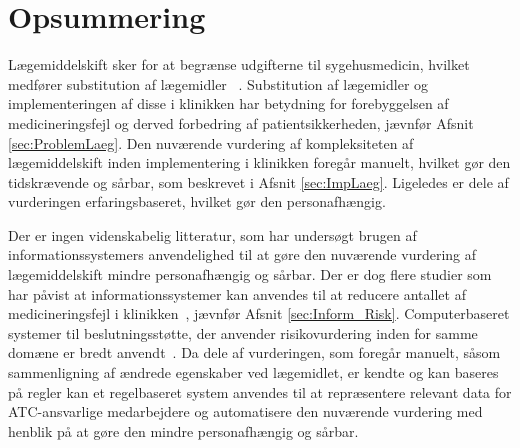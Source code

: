 
\section{Opsummering}
Lægemiddelskift sker for at begrænse udgifterne til sygehusmedicin, hvilket medfører substitution af lægemidler ~\citep{Ess2003, Johnston2011}. Substitution af lægemidler og implementeringen af disse i klinikken har betydning for forebyggelsen af medicineringsfejl og derved forbedring af patientsikkerheden, jævnfør Afsnit \ref{sec:ProblemLaeg}. Den nuværende vurdering af kompleksiteten af lægemiddelskift inden implementering i klinikken foregår manuelt, hvilket gør den tidskrævende og sårbar, som beskrevet i Afsnit \ref{sec:ImpLaeg}. Ligeledes er dele af vurderingen erfaringsbaseret, hvilket gør den personafhængig.

Der er ingen videnskabelig litteratur, som har undersøgt brugen af informationssystemers anvendelighed til at gøre den nuværende vurdering af lægemiddelskift mindre personafhængig og sårbar. Der er dog flere studier som har påvist at informationssystemer kan anvendes til at reducere antallet af medicineringsfejl i klinikken~\citep{Agrawal2009, Stenner2010, Fischer2008, Simpson2008}, jævnfør Afsnit \ref{sec:Inform_Risk}. Computerbaseret systemer til beslutningsstøtte, der anvender risikovurdering inden for samme domæne er bredt anvendt~\citep{Geissert2018, Rawshani2018}. Da dele af vurderingen, som foregår manuelt, såsom sammenligning af ændrede egenskaber ved lægemidlet, er kendte og kan baseres på regler kan et regelbaseret system anvendes til at repræsentere relevant data for ATC-ansvarlige medarbejdere og automatisere den nuværende vurdering med henblik på at gøre den mindre personafhængig og sårbar. 


